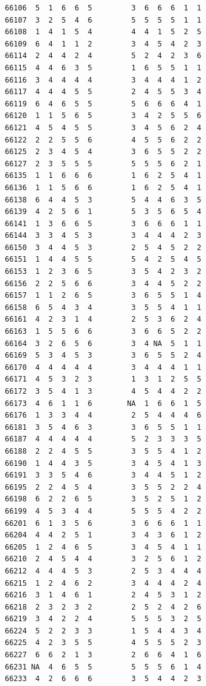 \documentclass[
  letterpaper,
  DIV=11,
  numbers=noendperiod]{scrreprt}
\begin{document}
\begin{verbatim}
66106  5  1  6  6  5         3  6  6  6  1  1
66107  3  2  5  4  6         5  5  5  5  1  1
66108  1  4  1  5  4         4  4  1  5  2  5
66109  6  4  1  1  2         3  4  5  4  2  3
66114  2  4  4  2  4         5  2  4  2  3  6
66115  4  4  6  3  5         1  6  5  5  1  1
66116  3  4  4  4  4         3  4  4  4  1  2
66117  4  4  4  5  5         2  4  5  5  3  4
66119  6  4  6  5  5         5  6  6  6  4  1
66120  1  1  5  6  5         3  4  2  5  5  6
66121  4  5  4  5  5         3  4  5  6  2  4
66122  2  2  5  5  6         4  5  5  6  2  2
66125  2  3  4  5  4         3  6  5  5  2  2
66127  2  3  5  5  5         5  5  5  6  2  1
66135  1  1  6  6  6         1  6  2  5  4  1
66136  1  1  5  6  6         1  6  2  5  4  1
66138  6  4  4  5  3         5  4  4  6  3  5
66139  4  2  5  6  1         5  3  5  6  5  4
66141  1  3  6  6  5         3  6  6  6  1  1
66144  3  3  4  5  3         3  4  4  4  2  3
66150  3  4  4  5  3         2  5  4  5  2  2
66151  1  4  4  5  5         5  4  2  5  4  5
66153  1  2  3  6  5         3  5  4  2  3  2
66156  2  2  5  6  6         3  4  4  5  2  2
66157  1  1  2  6  5         3  6  5  5  1  4
66158  6  5  4  3  4         3  5  5  4  1  1
66161  4  2  3  1  4         2  5  3  6  2  4
66163  1  5  5  6  6         3  6  6  5  2  2
66164  3  2  6  5  6         3  4 NA  5  1  1
66169  5  3  4  5  3         3  6  5  5  2  4
66170  4  4  4  4  4         3  4  4  4  1  1
66171  4  5  3  2  3         1  3  1  2  5  5
66172  3  5  4  1  3         4  5  4  4  2  2
66173  4  6  1  1  6        NA  1  6  6  1  5
66176  1  3  3  4  4         2  5  4  4  4  6
66181  3  5  4  6  3         3  6  5  5  1  1
66187  4  4  4  4  4         5  2  3  3  3  5
66188  2  2  4  5  5         3  5  5  4  1  2
66190  1  4  4  3  5         3  4  5  4  1  3
66191  3  3  5  4  6         3  4  4  5  1  2
66195  2  2  4  5  4         3  5  5  2  2  4
66198  6  2  2  6  5         3  5  2  5  1  2
66199  4  5  3  4  4         5  5  5  4  2  2
66201  6  1  3  5  6         3  6  6  6  1  1
66204  4  4  2  5  1         3  4  3  6  1  2
66205  1  2  4  6  5         3  4  5  4  1  1
66210  2  4  5  4  4         3  2  5  6  1  2
66212  4  4  4  5  3         2  5  3  4  4  4
66215  1  2  4  6  2         3  4  4  4  2  4
66216  3  1  4  6  1         2  4  5  3  1  2
66218  2  3  2  3  2         2  5  2  4  2  6
66219  3  4  2  2  4         5  5  5  3  2  5
66224  5  2  2  3  3         1  5  4  4  3  4
66225  4  2  3  5  5         4  5  5  5  2  3
66227  6  6  2  1  3         2  6  6  4  1  6
66231 NA  4  6  5  5         5  5  5  6  1  4
66233  4  2  6  6  6         3  5  4  4  2  3

\end{verbatim}
\end{document}
